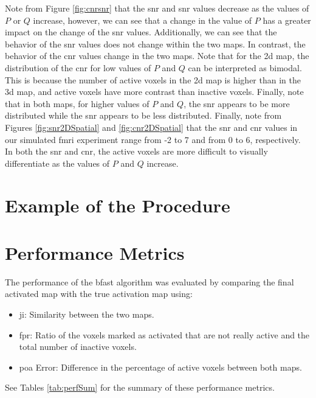 \newpage

Note from Figure \ref{fig:cnrsnr} that the \gls{snr} and \gls{snr} values decrease as the values of $P$ or $Q$ increase, however, we can see that a change in the value of $P$ has a greater impact on the change of the \gls{snr} values. Additionally, we can see that the behavior of the \gls{snr} values does not change within the two maps. In contrast, the behavior of the \gls{cnr} values change in the two maps. Note that for the \gls{2d} map, the distribution of the \gls{cnr} for low values of $P$ and $Q$ can be interpreted as bimodal. This is because the number of active voxels in the \gls{2d} map is higher than in the \gls{3d} map, and active voxels have more contrast than inactive voxels. Finally, note that in both maps, for higher values of $P$ and $Q$, the \gls{snr} appears to be more distributed while the \gls{snr} appears to be less distributed. Finally, note from Figures \ref{fig:snr2DSpatial} and \ref{fig:cnr2DSpatial} that the \gls{snr} and \gls{cnr} values in our simulated \gls{fmri} experiment range from -2 to 7 and from 0 to 6, respectively. In both the \gls{snr} and \gls{cnr}, the active voxels are more difficult to visually differentiate as the values of $P$ and $Q$ increase.

\section{Example of the Procedure}

\section{Performance Metrics}

The performance of the \gls{bfast} algorithm was evaluated by comparing the final activated map with the true activation map using:

\begin{itemize}
\item \gls{ji}: Similarity between the two maps.
\item \gls{fpr}: Ratio of the voxels marked as activated that are not really active and the total number of inactive voxels.
\item \gls{poa} Error: Difference in the percentage of active voxels between both maps.
\end{itemize}

See Tables \ref{tab:perfSum} for the summary of these performance metrics.

